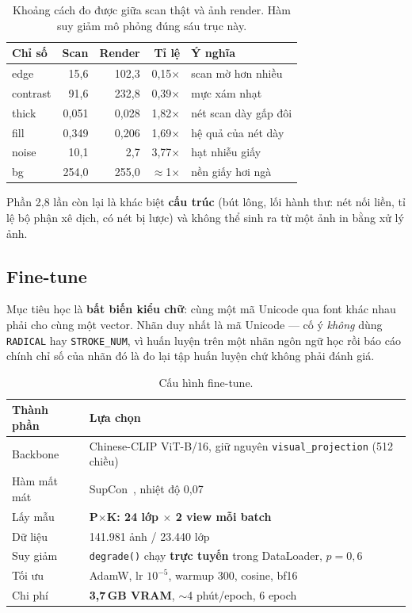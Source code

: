 \documentclass[conference,a4paper]{IEEEtran}
\newcommand{\code}[1]{{\small\texttt{#1}}}
\begin{document}
\begin{table}[t]
\caption{Khoảng cách đo được giữa scan thật và ảnh render. Hàm suy giảm mô phỏng đúng sáu trục này.}
\label{tab:degrade}
\centering\footnotesize
\begin{tabular}{@{}lrrrl@{}}
\toprule
Chỉ số & Scan & Render & Tỉ lệ & Ý nghĩa \\
\midrule
edge     & 15,6 & 102,3 & 0,15$\times$ & scan mờ hơn nhiều \\
contrast & 91,6 & 232,8 & 0,39$\times$ & mực xám nhạt \\
thick    & 0,051 & 0,028 & 1,82$\times$ & nét scan dày gấp đôi \\
fill     & 0,349 & 0,206 & 1,69$\times$ & hệ quả của nét dày \\
noise    & 10,1 & 2,7   & 3,77$\times$ & hạt nhiễu giấy \\
bg       & 254,0 & 255,0 & $\approx$1$\times$ & nền giấy hơi ngà \\
\bottomrule
\end{tabular}
\end{table}

Phần 2,8 lần còn lại là khác biệt \textbf{cấu trúc} (bút lông, lối hành thư: nét nối liền, tỉ lệ bộ
phận xê dịch, có nét bị lược) và không thể sinh ra từ một ảnh in bằng xử lý ảnh.

\subsection{Fine-tune}
\label{sec:ft}

Mục tiêu học là \textbf{bất biến kiểu chữ}: cùng một mã Unicode qua font khác nhau phải cho cùng một
vector. Nhãn duy nhất là mã Unicode --- cố ý \emph{không} dùng \code{RADICAL} hay \code{STROKE\_NUM},
vì huấn luyện trên một nhãn ngôn ngữ học rồi báo cáo chính chỉ số của nhãn đó là đo lại tập huấn
luyện chứ không phải đánh giá.

\begin{table}[t]
\caption{Cấu hình fine-tune.}
\label{tab:ft}
\centering\footnotesize
\begin{tabular}{@{}p{1.6cm}p{6.0cm}@{}}
\toprule
Thành phần & Lựa chọn \\
\midrule
Backbone & Chinese-CLIP ViT-B/16, giữ nguyên \code{visual\_projection} (512 chiều) \\
Hàm mất mát & SupCon~\cite{supcon}, nhiệt độ 0,07 \\
Lấy mẫu & \textbf{P$\times$K: 24 lớp $\times$ 2 view mỗi batch} \\
Dữ liệu & 141.981 ảnh / 23.440 lớp \\
Suy giảm & \code{degrade()} chạy \textbf{trực tuyến} trong DataLoader, $p = 0{,}6$ \\
Tối ưu & AdamW, lr $10^{-5}$, warmup 300, cosine, bf16 \\
Chi phí & \textbf{3,7\,GB VRAM}, $\sim$4 phút/epoch, 6 epoch \\
\bottomrule
\end{tabular}
\end{table}
\end{document}
